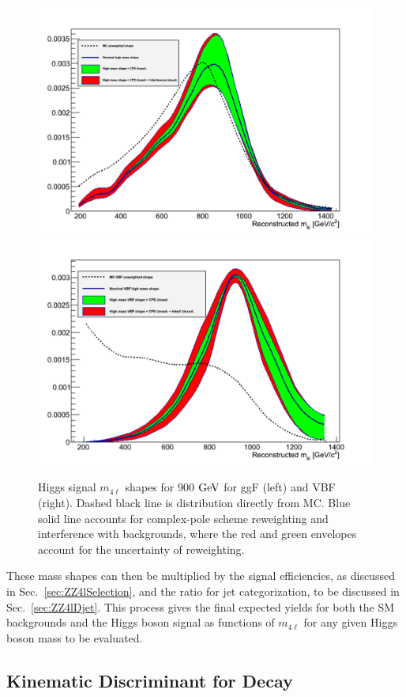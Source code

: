 \begin{figure}[htbp]
\begin{center}
\includegraphics[width=.45\linewidth]{HiggsDiscovery/figures/H900_4mu_Reco_syst.pdf}
\includegraphics[width=.45\linewidth]{HiggsDiscovery/figures/VBFH900_4mu_Reco_syst.pdf}
\caption[High Mass Higgs Signal Mass Shapes]{Higgs signal $m_{4\ell}$ shapes for 900 $\rm{GeV}$ for ggF (left) and VBF (right). Dashed black line is distribution directly from MC. Blue solid line accounts for complex-pole scheme reweighting and interference with backgrounds, where the red and green envelopes account for the uncertainty of reweighting.}
\label{fig:HMHiggsShape}
\end{center}
\end{figure}

These mass shapes can then be multiplied by the signal efficiencies, as discussed in Sec.~\ref{sec:ZZ4lSelection}, and the ratio for jet categorization, to be discussed in Sec.~\ref{sec:ZZ4lDjet}. This process gives the final expected yields for both the SM backgrounds and the Higgs boson signal as functions of $m_{4\ell}$ for any given Higgs boson mass to be evaluated.

\subsection{Kinematic Discriminant for Decay}
\label{sec:ZZ4lKD}

